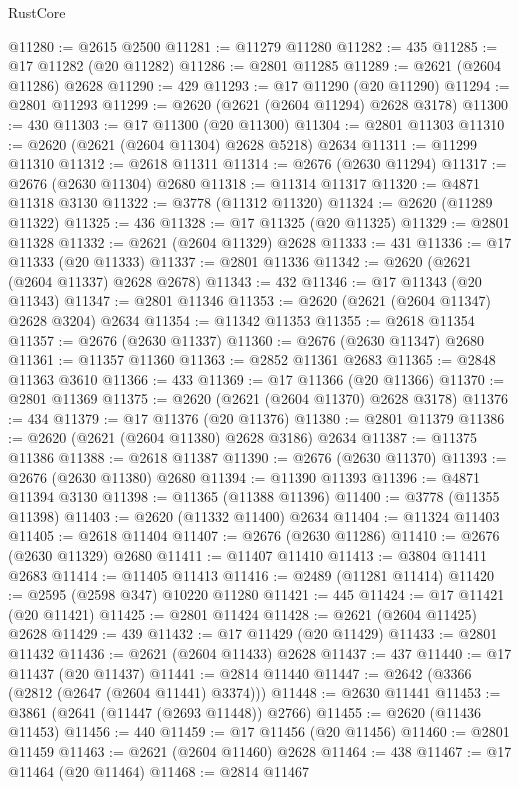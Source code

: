 \begin{lexlean}{RustCore}
\begin{coremodule}
@11280 := @2615 @2500
@11281 := @11279 @11280
@11282 := 435
@11285 := @17 @11282 (@20 @11282)
@11286 := @2801 @11285
@11289 := @2621 (@2604 @11286) @2628
@11290 := 429
@11293 := @17 @11290 (@20 @11290)
@11294 := @2801 @11293
@11299 := @2620 (@2621 (@2604 @11294) @2628 @3178)
@11300 := 430
@11303 := @17 @11300 (@20 @11300)
@11304 := @2801 @11303
@11310 := @2620 (@2621 (@2604 @11304) @2628 @5218) @2634
@11311 := @11299 @11310
@11312 := @2618 @11311
@11314 := @2676 (@2630 @11294)
@11317 := @2676 (@2630 @11304) @2680
@11318 := @11314 @11317
@11320 := @4871 @11318 @3130
@11322 := @3778 (@11312 @11320)
@11324 := @2620 (@11289 @11322)
@11325 := 436
@11328 := @17 @11325 (@20 @11325)
@11329 := @2801 @11328
@11332 := @2621 (@2604 @11329) @2628
@11333 := 431
@11336 := @17 @11333 (@20 @11333)
@11337 := @2801 @11336
@11342 := @2620 (@2621 (@2604 @11337) @2628 @2678)
@11343 := 432
@11346 := @17 @11343 (@20 @11343)
@11347 := @2801 @11346
@11353 := @2620 (@2621 (@2604 @11347) @2628 @3204) @2634
@11354 := @11342 @11353
@11355 := @2618 @11354
@11357 := @2676 (@2630 @11337)
@11360 := @2676 (@2630 @11347) @2680
@11361 := @11357 @11360
@11363 := @2852 @11361 @2683
@11365 := @2848 @11363 @3610
@11366 := 433
@11369 := @17 @11366 (@20 @11366)
@11370 := @2801 @11369
@11375 := @2620 (@2621 (@2604 @11370) @2628 @3178)
@11376 := 434
@11379 := @17 @11376 (@20 @11376)
@11380 := @2801 @11379
@11386 := @2620 (@2621 (@2604 @11380) @2628 @3186) @2634
@11387 := @11375 @11386
@11388 := @2618 @11387
@11390 := @2676 (@2630 @11370)
@11393 := @2676 (@2630 @11380) @2680
@11394 := @11390 @11393
@11396 := @4871 @11394 @3130
@11398 := @11365 (@11388 @11396)
@11400 := @3778 (@11355 @11398)
@11403 := @2620 (@11332 @11400) @2634
@11404 := @11324 @11403
@11405 := @2618 @11404
@11407 := @2676 (@2630 @11286)
@11410 := @2676 (@2630 @11329) @2680
@11411 := @11407 @11410
@11413 := @3804 @11411 @2683
@11414 := @11405 @11413
@11416 := @2489 (@11281 @11414)
@11420 := @2595 (@2598 @347) @10220 @11280
@11421 := 445
@11424 := @17 @11421 (@20 @11421)
@11425 := @2801 @11424
@11428 := @2621 (@2604 @11425) @2628
@11429 := 439
@11432 := @17 @11429 (@20 @11429)
@11433 := @2801 @11432
@11436 := @2621 (@2604 @11433) @2628
@11437 := 437
@11440 := @17 @11437 (@20 @11437)
@11441 := @2814 @11440
@11447 := @2642 (@3366 (@2812 (@2647 (@2604 @11441) @3374)))
@11448 := @2630 @11441
@11453 := @3861 (@2641 (@11447 (@2693 @11448)) @2766)
@11455 := @2620 (@11436 @11453)
@11456 := 440
@11459 := @17 @11456 (@20 @11456)
@11460 := @2801 @11459
@11463 := @2621 (@2604 @11460) @2628
@11464 := 438
@11467 := @17 @11464 (@20 @11464)
@11468 := @2814 @11467

\end{coremodule}
\end{lexlean}
